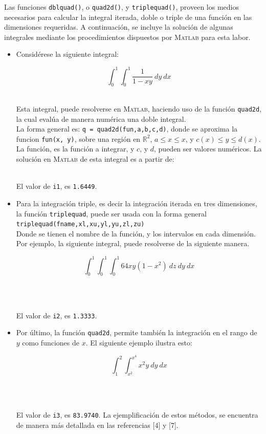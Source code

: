 \documentclass[11pt, spanish]{article}
\begin{document}
Las funciones \texttt{dblquad()}, o \texttt{quad2d()}, y \texttt{triplequad()}, proveen los medios necesarios para calcular la integral iterada, doble o triple de una función en las dimensiones requeridas. A continuación, se incluye la solución de algunas integrales mediante los procedimientos dispuestos por \textsc{Matlab} para esta labor.\\

\begin{itemize}

\item Considérese la siguiente integral:

$$\int_{0}^{1} \int_{0}^{1} \frac{1}{1-xy}\ dy\ dx$$\

Esta integral, puede resolverse en \textsc{Matlab}, haciendo uso de la función \texttt{quad2d}, la cual evalúa de manera numérica una doble integral.\\

La forma general es: \texttt{q = quad2d(fun,a,b,c,d)}, donde se aproxima la funcion \texttt{fun(x, y)}, sobre una región en $\mathbb{R}^2$, $a \leq x \leq x$, y $c(x) \leq y \leq d(x)$. La función, es la función a integrar, y $c$, y $d$, pueden ser valores numéricos. La solución en \textsc{Matlab} de esta integral es a partir de:\\

\

El valor de \texttt{i1}, es \texttt{1.6449}.

\item Para la integración triple, es decir la integración iterada en tres dimensiones, la función \texttt{triplequad}, puede ser usada con la forma general \\

\texttt{triplequad(fname,xl,xu,yl,yu,zl,zu)}\\
 
 Donde se tienen el nombre de la función, y los intervalos en cada dimensión. Por ejemplo, la siguiente integral, puede resolverse de la siguiente manera.\
 
$$\int_{0}^{1} \int_{0}^{1} \int_{0}^{1} 64 x y (1-x^2)\ dz\ dy\ dx$$\
 
\
 
El valor de \texttt{i2}, es \texttt{1.3333}.

\item Por último, la función \texttt{quad2d}, permite también la integración en el rango de $y$ como funciones de $x$. El siguiente ejemplo ilustra esto:
 
 $$\int_{1}^{2} \int_{x^2}^{x^4} x^2y\ dy\ dx$$\
 
  \
  
El valor de \texttt{i3}, es \texttt{83.9740}. La ejemplificación de estos métodos, se encuentra de manera más detallada en las referencias [4] y [7].

\end{itemize}
\end{document}
